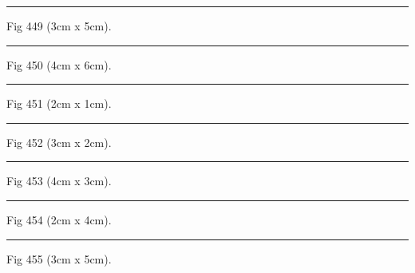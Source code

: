 \documentclass[a4paper,11pt]{article}
\begin{document}
\begin{swarmwrap}%
  \begin{minipage}[t]{3cm}
    \centering
    \rule{\linewidth}{5cm}
    {\footnotesize Fig 449 (3cm x 5cm).}
  \end{minipage}%
\end{swarmwrap}%
\swarmwrapnext
\lipsum[149]%

\begin{swarmwrap}%
  \begin{minipage}[t]{4cm}
    \centering
    \rule{\linewidth}{6cm}
    {\footnotesize Fig 450 (4cm x 6cm).}
  \end{minipage}%
\end{swarmwrap}%
\swarmwrapnext
\lipsum[150]%

\begin{swarmwrap}%
  \begin{minipage}[t]{2cm}
    \centering
    \rule{\linewidth}{1cm}
    {\footnotesize Fig 451 (2cm x 1cm).}
  \end{minipage}%
\end{swarmwrap}%
\swarmwrapnext
\lipsum[1]%

\begin{swarmwrap}%
  \begin{minipage}[t]{3cm}
    \centering
    \rule{\linewidth}{2cm}
    {\footnotesize Fig 452 (3cm x 2cm).}
  \end{minipage}%
\end{swarmwrap}%
\swarmwrapnext
\lipsum[2]%

\begin{swarmwrap}%
  \begin{minipage}[t]{4cm}
    \centering
    \rule{\linewidth}{3cm}
    {\footnotesize Fig 453 (4cm x 3cm).}
  \end{minipage}%
\end{swarmwrap}%
\swarmwrapnext
\lipsum[3]%

\begin{swarmwrap}%
  \begin{minipage}[t]{2cm}
    \centering
    \rule{\linewidth}{4cm}
    {\footnotesize Fig 454 (2cm x 4cm).}
  \end{minipage}%
\end{swarmwrap}%
\swarmwrapnext
\lipsum[4]%

\begin{swarmwrap}%
  \begin{minipage}[t]{3cm}
    \centering
    \rule{\linewidth}{5cm}
    {\footnotesize Fig 455 (3cm x 5cm).}
  \end{minipage}%
\end{swarmwrap}%
\swarmwrapnext
\lipsum[5]%
\end{document}
